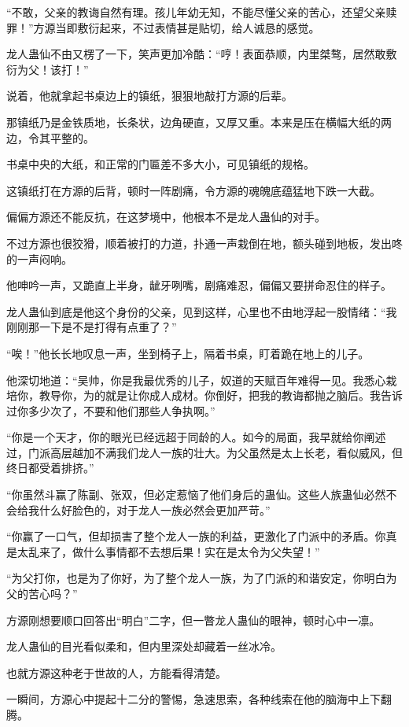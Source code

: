 \begin{this_body}
“不敢，父亲的教诲自然有理。孩儿年幼无知，不能尽懂父亲的苦心，还望父亲赎罪！”方源当即敷衍起来，不过表情甚是贴切，给人诚恳的感觉。

龙人蛊仙不由又楞了一下，笑声更加冷酷：“哼！表面恭顺，内里桀骜，居然敢敷衍为父！该打！”

说着，他就拿起书桌边上的镇纸，狠狠地敲打方源的后辈。

那镇纸乃是金铁质地，长条状，边角硬直，又厚又重。本来是压在横幅大纸的两边，令其平整的。

书桌中央的大纸，和正常的门匾差不多大小，可见镇纸的规格。

这镇纸打在方源的后背，顿时一阵剧痛，令方源的魂魄底蕴猛地下跌一大截。

偏偏方源还不能反抗，在这梦境中，他根本不是龙人蛊仙的对手。

不过方源也很狡猾，顺着被打的力道，扑通一声栽倒在地，额头碰到地板，发出咚的一声闷响。

他呻吟一声，又跪直上半身，龇牙咧嘴，剧痛难忍，偏偏又要拼命忍住的样子。

龙人蛊仙到底是他这个身份的父亲，见到这样，心里也不由地浮起一股情绪：“我刚刚那一下是不是打得有点重了？”

“唉！”他长长地叹息一声，坐到椅子上，隔着书桌，盯着跪在地上的儿子。

他深切地道：“吴帅，你是我最优秀的儿子，奴道的天赋百年难得一见。我悉心栽培你，教导你，为的就是让你成人成材。你倒好，把我的教诲都抛之脑后。我告诉过你多少次了，不要和他们那些人争执啊。”

“你是一个天才，你的眼光已经远超于同龄的人。如今的局面，我早就给你阐述过，门派高层越加不满我们龙人一族的壮大。为父虽然是太上长老，看似威风，但终日都受着排挤。”

“你虽然斗赢了陈副、张双，但必定惹恼了他们身后的蛊仙。这些人族蛊仙必然不会给我什么好脸色的，对于龙人一族必然会更加严苛。”

“你赢了一口气，但却损害了整个龙人一族的利益，更激化了门派中的矛盾。你真是太乱来了，做什么事情都不去想后果！实在是太令为父失望！”

“为父打你，也是为了你好，为了整个龙人一族，为了门派的和谐安定，你明白为父的苦心吗？”

方源刚想要顺口回答出“明白”二字，但一瞥龙人蛊仙的眼神，顿时心中一凛。

龙人蛊仙的目光看似柔和，但内里深处却藏着一丝冰冷。

也就方源这种老于世故的人，方能看得清楚。

一瞬间，方源心中提起十二分的警惕，急速思索，各种线索在他的脑海中上下翻腾。


\end{this_body}
